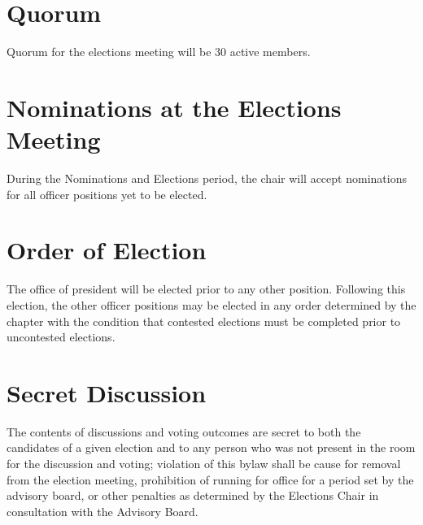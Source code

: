 \section{Quorum}
Quorum for the elections meeting will be 30 active members.

\section{Nominations at the Elections Meeting}
During the Nominations and Elections period, the chair will accept nominations for all officer positions yet to be elected.

\section{Order of Election}
The office of president will be elected prior to any other position. Following this election, the other officer positions may be elected in any order determined by the chapter with the condition that contested elections must be completed prior to uncontested elections. 

\section{Secret Discussion}
The contents of discussions and voting outcomes are secret to both the candidates of a given election and to any person who was not present in the room for the discussion and voting; violation of this bylaw shall be cause for removal from the election meeting, prohibition of running for office for a period set by the advisory board, or other penalties as determined by the Elections Chair in consultation with the Advisory Board.

